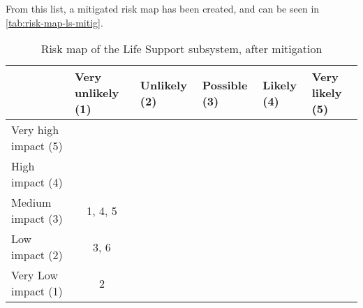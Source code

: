 \noindent From this list, a mitigated risk map has been created, and can be seen in \autoref{tab:risk-map-ls-mitig}.

\begin{table}[H]
\centering
\caption{Risk map of the Life Support subsystem, after mitigation}
\label{tab:risk-map-ls-mitig}\begin{tabular}{l|c|c|c|c|c|}
\cline{2-6}
& \multicolumn{1}{l|}{Very unlikely (1)} & \multicolumn{1}{l|}{Unlikely (2)} & \multicolumn{1}{l|}{Possible (3)} & \multicolumn{1}{l|}{Likely (4)} & \multicolumn{1}{l|}{Very likely (5)} \\ \hline
\multicolumn{1}{|l|}{Very high impact (5)} & \cellcolor{rm-3} & \cellcolor{rm-3} & \cellcolor{rm-3} & \cellcolor{rm-3} & \cellcolor{rm-3}\\ \hline 
\multicolumn{1}{|l|}{High impact (4)} & \cellcolor{rm-2} & \cellcolor{rm-2} & \cellcolor{rm-2} & \cellcolor{rm-3} & \cellcolor{rm-3}\\ \hline 
\multicolumn{1}{|l|}{Medium impact (3)} & \cellcolor{rm-0}1, 4, 5 & \cellcolor{rm-1} & \cellcolor{rm-1} & \cellcolor{rm-2} & \cellcolor{rm-3}\\ \hline 
\multicolumn{1}{|l|}{Low impact (2)} & \cellcolor{rm-0}3, 6 & \cellcolor{rm-0} & \cellcolor{rm-1} & \cellcolor{rm-2} & \cellcolor{rm-3}\\ \hline 
\multicolumn{1}{|l|}{Very Low impact (1)} & \cellcolor{rm-0}2 & \cellcolor{rm-0} & \cellcolor{rm-0} & \cellcolor{rm-2} & \cellcolor{rm-3}\\ \hline 
\end{tabular} 
\end{table}

